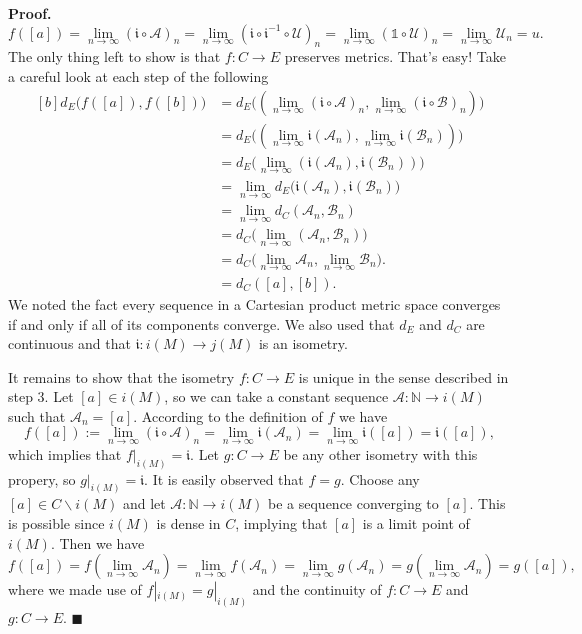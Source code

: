 \documentclass[10pt]{article}
\theoremstyle{definition}
\theoremstyle{remark}
\newenvironment{prf}{\noindent\textbf{Proof.}}{\hfill$\blacksquare$}
\begin{document}
\begin{prf}
\begin{equation}
f([a])=\lim_{n\to\infty}(\mathfrak{i}\circ\mathcal{A})_n
=\lim_{n\to\infty}(\mathfrak{i}\circ\mathfrak{i}^{-1}\circ\mathcal{U})_n
=\lim_{n\to\infty}(\mathds{1}\circ\mathcal{U})_n
=\lim_{n\to\infty}\mathcal{U}_n=u.
\end{equation}
The only thing left to show is that $f:C\to E$ preserves metrics. That's easy! Take a careful look at each step of the following
\begin{equation}
\begin{aligned}[b]
d_E\big(f([a]),f([b])\big) &= d_E\big((\lim_{n\to\infty}(\mathfrak{i}\circ\mathcal{A})_n,\lim_{n\to\infty}(\mathfrak{i}\circ \mathcal{B})_n)\big) \\
&= d_E\big((\lim_{n\to\infty}\mathfrak{i}(\mathcal{A}_n),\lim_{n\to\infty}\mathfrak{i}(\mathcal{B}_n))\big) \\
&= d_E\big(\lim_{n\to\infty}(\mathfrak{i}(\mathcal{A}_n),\mathfrak{i}(\mathcal{B}_n))\big) \\
&= \lim_{n\to\infty}d_E\big(\mathfrak{i}(\mathcal{A}_n),\mathfrak{i}(\mathcal{B}_n)\big) \\
&= \lim_{n\to\infty}d_C(\mathcal{A}_n,\mathcal{B}_n) \\
&= d_C\big(\lim_{n\to\infty}(\mathcal{A}_n,\mathcal{B}_n)\big) \\
&= d_C\big(\lim_{n\to\infty}\mathcal{A}_n,\lim_{n\to\infty}\mathcal{B}_n\big). \\
&= d_C([a],[b]).
\end{aligned}
\end{equation}
We noted the fact every sequence in a Cartesian product metric space converges if and only if all of its components converge. We also used that $d_E$ and $d_C$ are continuous and that $\mathfrak{i}:i(M)\to j(M)$ is an isometry.

It remains to show that the isometry $f:C\to E$ is unique in the sense described in step 3. Let $[a]\in i(M)$, so we can take a constant sequence $\mathcal{A}:\mathbb{N}\to i(M)$ such that $\mathcal{A}_n=[a]$. According to the definition of $f$ we have
\begin{equation}
f([a]):=\lim_{n\to\infty}(\mathfrak{i}\circ\mathcal{A})_n=\lim_{n\to\infty}\mathfrak{i}(\mathcal{A}_n)=\lim_{n\to\infty}\mathfrak{i}([a])=\mathfrak{i}([a]),
\end{equation}
which implies that $f|_{i(M)}=\mathfrak{i}$. Let $g:C\to E$ be any other isometry with this propery, so $g|_{i(M)}=\mathfrak{i}$. It is easily observed that $f=g$. Choose any $[a]\in C\backslash i(M)$ and let $\mathcal{A}:\mathbb{N}\to i(M)$ be a sequence converging to $[a]$. This is possible since $i(M)$ is dense in $C$, implying that $[a]$ is a limit point of $i(M)$. Then we have
\begin{equation}
f([a])=f(\lim_{n\to\infty}\mathcal{A}_n)=\lim_{n\to\infty}f(\mathcal{A}_n)=\lim_{n\to\infty}g(\mathcal{A}_n)=g(\lim_{n\to\infty}\mathcal{A}_n)=g([a]),
\end{equation}
where we made use of $f|_{i(M)}=g|_{i(M)}$ and the continuity of $f:C\to E$ and $g:C\to E$.
\end{prf}
\end{document}
